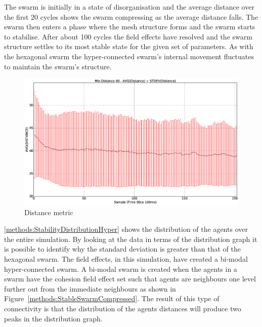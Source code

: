 The swarm is initially in a state of disorganisation and the average distance over the first 20 cycles shows the swarm compressing as the average distance falls. The swarm then enters a phase where the mesh structure forms and the swarm starts to stabilise. After about 100 cycles the field effects have resolved and the swarm structure settles to its most stable state for the given set of parameters. As with the hexagonal swarm the hyper-connected swarm's internal movement fluctuates to maintain the swarm's structure.
\begin{figure}[H]
\begin{center}
\includegraphics[width=13cm]{CHAPTER-5/figures/StabilityDistanceSwarm40-60}
\end{center}
\caption{Distance metric\label{methods:StabilityDistanceSwarm40-60}}
\end{figure}

\autoref{methods:StabilityDistributionHyper} shows the distribution of the agents over the entire simulation. By looking at the data in terms of the distribution graph it is possible to identify why the standard deviation is greater than that of the hexagonal swarm. The field effects, in this simulation, have created a bi-modal hyper-connected swarm. A bi-modal swarm is created when the agents in a swarm have the cohesion field effect set such that agents are neighbours one level further out from the immediate neighbours as shown in Figure~\ref{methods:StableSwarmCompressed}. The result of this type of connectivity is that the distribution of the agents distances will produce two peaks in the distribution graph.

